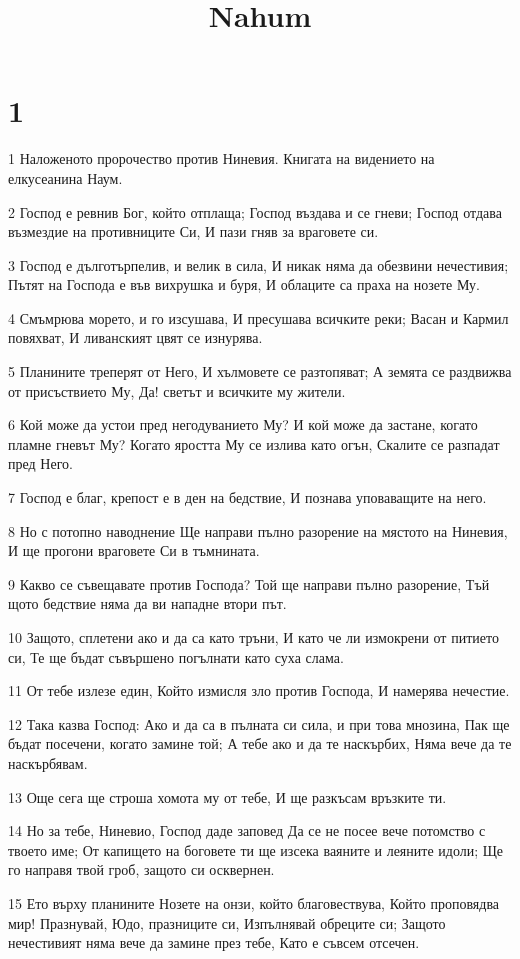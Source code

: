

\title{Nahum}


\chapter{1}

\par 1 Наложеното пророчество против Ниневия. Книгата на видението на елкусеанина Наум.
\par 2 Господ е ревнив Бог, който отплаща; Господ въздава и се гневи; Господ отдава възмездие на противниците Си, И пази гняв за враговете си.
\par 3 Господ е дълготърпелив, и велик в сила, И никак няма да обезвини нечестивия; Пътят на Господа е във вихрушка и буря, И облаците са праха на нозете Му.
\par 4 Смъмрюва морето, и го изсушава, И пресушава всичките реки; Васан и Кармил повяхват, И ливанският цвят се изнурява.
\par 5 Планините треперят от Него, И хълмовете се разтопяват; А земята се раздвижва от присъствието Му, Да! светът и всичките му жители.
\par 6 Кой може да устои пред негодуванието Му? И кой може да застане, когато пламне гневът Му? Когато яростта Му се излива като огън, Скалите се разпадат пред Него.
\par 7 Господ е благ, крепост е в ден на бедствие, И познава уповаващите на него.
\par 8 Но с потопно наводнение Ще направи пълно разорение на мястото на Ниневия, И ще прогони враговете Си в тъмнината.
\par 9 Какво се съвещавате против Господа? Той ще направи пълно разорение, Тъй щото бедствие няма да ви нападне втори път.
\par 10 Защото, сплетени ако и да са като тръни, И като че ли измокрени от питието си, Те ще бъдат съвършено погълнати като суха слама.
\par 11 От тебе излезе един, Който измисля зло против Господа, И намерява нечестие.
\par 12 Така казва Господ: Ако и да са в пълната си сила, и при това мнозина, Пак ще бъдат посечени, когато замине той; А тебе ако и да те наскърбих, Няма вече да те наскърбявам.
\par 13 Още сега ще строша хомота му от тебе, И ще разкъсам връзките ти.
\par 14 Но за тебе, Ниневио, Господ даде заповед Да се не посее вече потомство с твоето име; От капището на боговете ти ще изсека ваяните и леяните идоли; Ще го направя твой гроб, защото си осквернен.
\par 15 Ето върху планините Нозете на онзи, който благовествува, Който проповядва мир! Празнувай, Юдо, празниците си, Изпълнявай обреците си; Защото нечестивият няма вече да замине през тебе, Като е съвсем отсечен.

